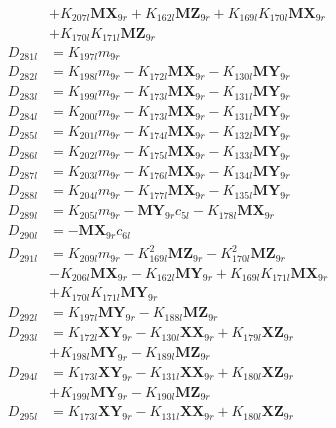 \begin{multicols}{2}
\begin{align}
&+ K_{207l}\mathbf{MX}_{9r} + K_{162l}\mathbf{MZ}_{9r} + K_{169l}K_{170l}\mathbf{MX}_{9r}  \nonumber \\
&+ K_{170l}K_{171l}\mathbf{MZ}_{9r} \nonumber \\
D_{281l} &= K_{197l}m_{9r} \nonumber \\
D_{282l} &= K_{198l}m_{9r} - K_{172l}\mathbf{MX}_{9r} - K_{130l}\mathbf{MY}_{9r} \nonumber \\
D_{283l} &= K_{199l}m_{9r} - K_{173l}\mathbf{MX}_{9r} - K_{131l}\mathbf{MY}_{9r} \nonumber \\
D_{284l} &= K_{200l}m_{9r} - K_{173l}\mathbf{MX}_{9r} - K_{131l}\mathbf{MY}_{9r} \nonumber \\
D_{285l} &= K_{201l}m_{9r} - K_{174l}\mathbf{MX}_{9r} - K_{132l}\mathbf{MY}_{9r} \nonumber \\
D_{286l} &= K_{202l}m_{9r} - K_{175l}\mathbf{MX}_{9r} - K_{133l}\mathbf{MY}_{9r} \nonumber \\
D_{287l} &= K_{203l}m_{9r} - K_{176l}\mathbf{MX}_{9r} - K_{134l}\mathbf{MY}_{9r} \nonumber \\
D_{288l} &= K_{204l}m_{9r} - K_{177l}\mathbf{MX}_{9r} - K_{135l}\mathbf{MY}_{9r} \nonumber \\
D_{289l} &= K_{205l}m_{9r} - \mathbf{MY}_{9r}c_{5l} - K_{178l}\mathbf{MX}_{9r} \nonumber \\
D_{290l} &= -\mathbf{MX}_{9r}c_{6l} \nonumber \\
D_{291l} &= K_{209l}m_{9r} - K_{169l}^2\mathbf{MZ}_{9r} - K_{170l}^2\mathbf{MZ}_{9r}  \nonumber \\
&- K_{206l}\mathbf{MX}_{9r} - K_{162l}\mathbf{MY}_{9r} + K_{169l}K_{171l}\mathbf{MX}_{9r}  \nonumber \\
&+ K_{170l}K_{171l}\mathbf{MY}_{9r} \nonumber \\
D_{292l} &= K_{197l}\mathbf{MY}_{9r} - K_{188l}\mathbf{MZ}_{9r} \nonumber \\
D_{293l} &= K_{172l}\mathbf{XY}_{9r} - K_{130l}\mathbf{XX}_{9r} + K_{179l}\mathbf{XZ}_{9r}  \nonumber \\
&+ K_{198l}\mathbf{MY}_{9r} - K_{189l}\mathbf{MZ}_{9r} \nonumber \\
D_{294l} &= K_{173l}\mathbf{XY}_{9r} - K_{131l}\mathbf{XX}_{9r} + K_{180l}\mathbf{XZ}_{9r}  \nonumber \\
&+ K_{199l}\mathbf{MY}_{9r} - K_{190l}\mathbf{MZ}_{9r} \nonumber \\
D_{295l} &= K_{173l}\mathbf{XY}_{9r} - K_{131l}\mathbf{XX}_{9r} + K_{180l}\mathbf{XZ}_{9r}  \nonumber \\

\end{align}
\end{multicols}
